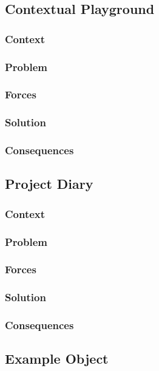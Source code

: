 \documentclass[sigconf]{acmart}
\begin{document}
\subsection{Contextual Playground}
\subsubsection*{Context}
\subsubsection*{Problem}
\subsubsection*{Forces}
\subsubsection*{Solution}
\subsubsection*{Consequences}


\subsection{Project Diary}
\subsubsection*{Context}
\subsubsection*{Problem}
\subsubsection*{Forces}
\subsubsection*{Solution}
\subsubsection*{Consequences}



\subsection{Example Object}
\end{document}
